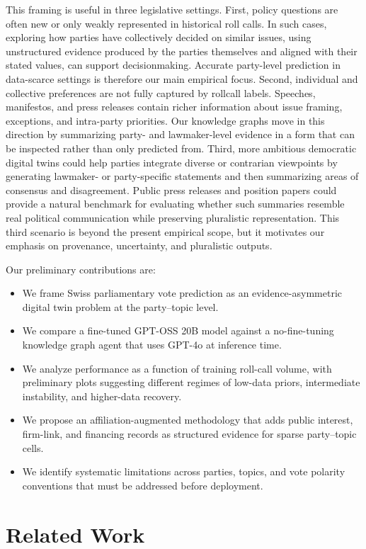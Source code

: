 \documentclass[letterpaper]{article}
\begin{document}
This framing is useful in three legislative settings. First,
policy questions are often new or only weakly represented
in historical roll calls. In such cases, exploring how parties have collectively decided on similar issues, using unstructured evidence produced by the parties themselves
and aligned with their stated values, can support decisionmaking. Accurate party-level prediction in data-scarce settings is therefore our main empirical focus. Second, individual and collective preferences are not fully captured by rollcall labels. Speeches, manifestos, and press releases contain richer information about issue framing, exceptions, and
intra-party priorities. Our knowledge graphs move in this direction by summarizing party- and lawmaker-level evidence
in a form that can be inspected rather than only predicted
from. Third, more ambitious democratic digital twins could
help parties integrate diverse or contrarian viewpoints by
generating lawmaker- or party-specific statements and then
summarizing areas of consensus and disagreement. Public
press releases and position papers could provide a natural
benchmark for evaluating whether such summaries resemble real political communication while preserving pluralistic
representation. This third scenario is beyond the present empirical scope, but it motivates our emphasis on provenance,
uncertainty, and pluralistic outputs.

Our preliminary contributions are:
\begin{itemize}
    \item We frame Swiss parliamentary vote prediction as an evidence-asymmetric digital twin problem at the party--topic level.
    \item We compare a fine-tuned GPT-OSS 20B model against a no-fine-tuning knowledge graph agent that uses GPT-4o at inference time.
    \item We analyze performance as a function of training roll-call volume, with preliminary plots suggesting different regimes of low-data priors, intermediate instability, and higher-data recovery.
    \item We propose an affiliation-augmented methodology that adds public interest, firm-link, and financing records as structured evidence for sparse party--topic cells.
    \item We identify systematic limitations across parties, topics, and vote polarity conventions that must be addressed before deployment.
\end{itemize}

\section{Related Work}
\end{document}
